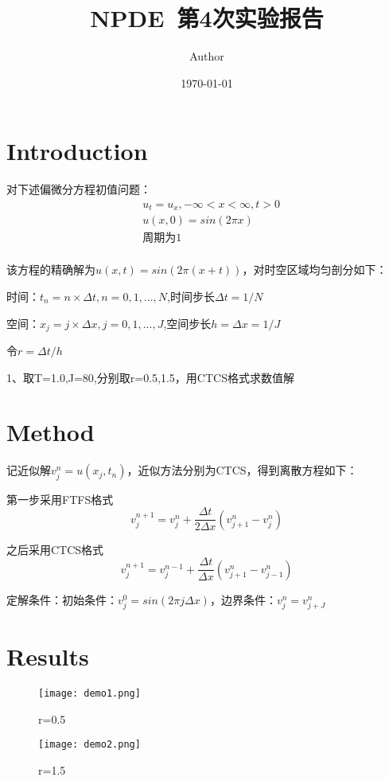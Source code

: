 \documentclass{article}
\title{NPDE~第4次实验报告}
\author{Author}
\date{\today}
\begin{document}
\maketitle

\section{Introduction}

对下述偏微分方程初值问题：
$$
\begin{aligned}
    &u_t=u_x,-\infty<x<\infty,t>0\\
    &u(x,0)=sin(2\pi x)\\
    &\text{周期为1}\\
\end{aligned}
$$

该方程的精确解为$u(x,t)=sin(2\pi(x+t))$，对时空区域均匀剖分如下：

时间：$t_n=n\times \Delta t,n=0,1,...,N$,时间步长$\Delta t=1/N$

空间：$x_j=j\times \Delta x,j=0,1,...,J$,空间步长$h=\Delta x=1/J$

令$r=\Delta t/h$

1、取T=1.0,J=80,分别取r=0.5,1.5，用CTCS格式求数值解
\section{Method}

记近似解$v_j^n=u(x_j,t_n)$，近似方法分别为CTCS，得到离散方程如下：

第一步采用FTFS格式
$$v_j^{n+1}=v_j^n+\frac{\Delta t}{2\Delta x}(v_{j+1}^n-v_{j}^n)$$

之后采用CTCS格式
$$v_j^{n+1}=v_j^{n-1}+\frac{\Delta t}{\Delta x}(v_{j+1}^n-v_{j-1}^n)$$

定解条件：初始条件：$v_j^0=sin(2\pi j\Delta x)$，边界条件：$v_j^n=v_{j+J}^n$


\section{Results}

\begin{figure}[H]
    \centering
    \texttt{[image: demo1.png]}
    \caption{r=0.5}\label{fig:demo1}
\end{figure}

\begin{figure}[H]
    \centering
    \texttt{[image: demo2.png]}
    \caption{r=1.5}\label{fig:demo2}
\end{figure}
\end{document}
